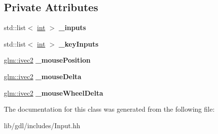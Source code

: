 \subsection*{Private Attributes}
\begin{DoxyCompactItemize}
\item 
\hypertarget{classgdl_1_1_input_a5ea5785adf82a05ba063db0eabdbbdec}{}std\+::list$<$ \hyperlink{_s_d_l__thread_8h_a6a64f9be4433e4de6e2f2f548cf3c08e}{int} $>$ {\bfseries \+\_\+inputs}\label{classgdl_1_1_input_a5ea5785adf82a05ba063db0eabdbbdec}

\item 
\hypertarget{classgdl_1_1_input_adeee18a4c305853daac3b43e6318f244}{}std\+::list$<$ \hyperlink{_s_d_l__thread_8h_a6a64f9be4433e4de6e2f2f548cf3c08e}{int} $>$ {\bfseries \+\_\+key\+Inputs}\label{classgdl_1_1_input_adeee18a4c305853daac3b43e6318f244}

\item 
\hypertarget{classgdl_1_1_input_a3e88cc5cafd06d625b4e553f96b500eb}{}\hyperlink{group__core__types_ga606b9d298d8aaa55c449182c340b4622}{glm\+::ivec2} {\bfseries \+\_\+mouse\+Position}\label{classgdl_1_1_input_a3e88cc5cafd06d625b4e553f96b500eb}

\item 
\hypertarget{classgdl_1_1_input_a11cc55c61d6a00d9b83632aeeeeed594}{}\hyperlink{group__core__types_ga606b9d298d8aaa55c449182c340b4622}{glm\+::ivec2} {\bfseries \+\_\+mouse\+Delta}\label{classgdl_1_1_input_a11cc55c61d6a00d9b83632aeeeeed594}

\item 
\hypertarget{classgdl_1_1_input_a20209fae01946c5ff185d67b8c9d4b39}{}\hyperlink{group__core__types_ga606b9d298d8aaa55c449182c340b4622}{glm\+::ivec2} {\bfseries \+\_\+mouse\+Wheel\+Delta}\label{classgdl_1_1_input_a20209fae01946c5ff185d67b8c9d4b39}

\end{DoxyCompactItemize}


The documentation for this class was generated from the following file\+:\begin{DoxyCompactItemize}
\item 
lib/gdl/includes/Input.\+hh\end{DoxyCompactItemize}

